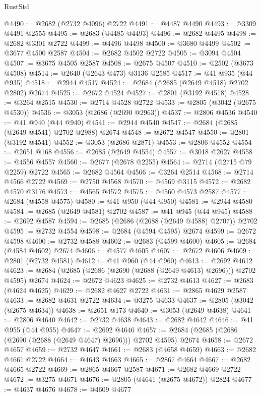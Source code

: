 \begin{lexlean}{RustStd}
\begin{coremodule}
@4490 := @2682 (@2732 @4096) @2722
@4491 := @4487 @4490
@4493 := @3309 @4491 @2555
@4495 := @2683 (@4485 @4493)
@4496 := @2682 @4495
@4498 := @2682 @3301 @2722
@4499 := @4496 @4498
@4500 := @3680 @4499
@4502 := @3677 @4500 @2587
@4504 := @2682 @4502 @2722
@4505 := @3094 @4504
@4507 := @3675 @4505 @2587
@4508 := @2675 @4507
@4510 := @2502 (@3673 @4508)
@4514 := @2640 (@2643 @473) @3136 @2585
@4517 := @41 @935 (@44 @935)
@4518 := @2944 @4517
@4524 := @2684 (@2685 (@2649 @4518) @2702 @2802) @2674
@4525 := @2672 @4524
@4527 := @2801 (@3192 @4518)
@4528 := @3264 @2515
@4530 := @2714 @4528 @2722
@4533 := @2805 (@3042 (@2675 @4530))
@4536 := @3053 (@2686 (@2690 @2963))
@4537 := @2806 @4536
@4540 := @41 @940 (@44 @940)
@4541 := @2944 @4540
@4547 := @2684 (@2685 (@2649 @4541) @2702 @2988) @2674
@4548 := @2672 @4547
@4550 := @2801 (@3192 @4541)
@4552 := @3053 (@2686 @2871)
@4553 := @2806 @4552
@4554 := @2651 @168
@4556 := @2685 (@2649 @4554)
@4557 := @3018 @2627
@4558 := @4556 @4557
@4560 := @2677 (@2678 @2255)
@4564 := @2714 (@2715 @79 @2259) @2722
@4565 := @2682 @4564
@4566 := @3264 @2514
@4568 := @2714 @4566 @2722
@4569 := @2750 @4568
@4570 := @4569 @3115
@4572 := @2682 @4570 @3176
@4573 := @4565 @4572
@4575 := @4560 @4573 @2587
@4577 := @2684 (@4558 @4575)
@4580 := @41 @950 (@44 @950)
@4581 := @2944 @4580
@4584 := @2685 (@2649 @4581) @2702
@4587 := @41 @945 (@44 @945)
@4588 := @2692 @4587
@4594 := @2685 (@2686 (@2688 (@2649 @4588) @2707)) @2702
@4595 := @2732 @4554
@4598 := @2684 (@4594 @4595) @2674
@4599 := @2672 @4598
@4600 := @2732 @4588
@4602 := @2683 (@4599 @4600)
@4605 := @2684 (@4584 @4602) @2674
@4606 := @4577 @4605
@4607 := @2672 @4606
@4609 := @2801 (@2732 @4581)
@4612 := @41 @960 (@44 @960)
@4613 := @2692 @4612
@4623 := @2684 (@2685 (@2686 (@2690 (@2688 (@2649 @4613) @2696))) @2702 @4595) @2674
@4624 := @2672 @4623
@4625 := @2732 @4613
@4627 := @2683 (@4624 @4625)
@4629 := @2682 @4627 @2722
@4631 := @2865 @4629 @2587
@4633 := @2682 @4631 @2722
@4634 := @3275 @4633
@4637 := @2805 (@3042 (@2675 @4634))
@4638 := @2651 @173
@4640 := @3053 (@2649 @4638)
@4641 := @2806 @4640
@4642 := @2732 @4638
@4643 := @2682 @4642
@4646 := @41 @955 (@44 @955)
@4647 := @2692 @4646
@4657 := @2684 (@2685 (@2686 (@2690 (@2688 (@2649 @4647) @2696))) @2702 @4595) @2674
@4658 := @2672 @4657
@4659 := @2732 @4647
@4661 := @2683 (@4658 @4659)
@4663 := @2682 @4661 @2722
@4664 := @4643 @4663
@4665 := @2867 @4664
@4667 := @2682 @4665 @2722
@4669 := @2865 @4667 @2587
@4671 := @2682 @4669 @2722
@4672 := @3275 @4671
@4676 := @2805 (@4641 (@2675 @4672)) @2824
@4677 := @4637 @4676
@4678 := @4609 @4677

\end{coremodule}
\end{lexlean}
